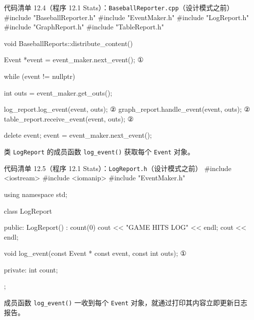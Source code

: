 \begin{codeboxt}{代码清单 12.4（程序 12.1 Stats）：\texttt{Baseball\allowbreak{}Reporter.\allowbreak{}cpp}（设计模式之前）}
#include "BaseballReporter.h"
#include "EventMaker.h"
#include "LogReport.h"
#include "GraphReport.h"
#include "TableReport.h"

void BaseballReports::distribute_content()
{
    Event *event = event_maker.next_event();        ①

    while (event != nullptr)
    {
        int outs = event_maker.get_outs();

        log_report.log_event(event, outs);          ②
        graph_report.handle_event(event, outs);     ②
        table_report.receive_event(event, outs);    ②

        delete event;
        event = event_maker.next_event();
    }
}
\end{codeboxt}
\par
{}\par


类 \texttt{LogReport} 的成员函数 \texttt{log\_\allowbreak{}event(\allowbreak{})\allowbreak{}} 获取每个 \texttt{Event} 对象。

\begin{codeboxt}{代码清单 12.5（程序 12.1 Stats）：\texttt{Log\allowbreak{}Report.\allowbreak{}h}（设计模式之前）}
#include <iostream>
#include <iomanip>
#include "EventMaker.h"

using namespace std;

class LogReport
{
public:
    LogReport() : count(0)
    {
        cout << "GAME HITS LOG" << endl;
        cout << endl;
    }

    void log_event(const Event * const event, const int outs); ①

private:
    int count;
};
\end{codeboxt}
\par

成员函数 \texttt{log\_\allowbreak{}event(\allowbreak{})\allowbreak{}} 一收到每个 \texttt{Event} 对象，就通过打印其内容立即更新日志报告。

